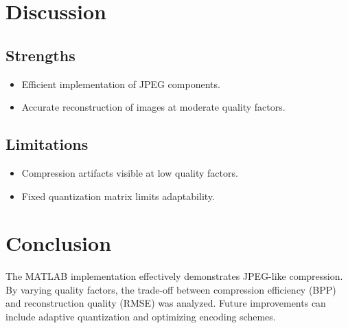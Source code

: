 \documentclass{article}
\begin{document}
\section{Discussion}
\subsection{Strengths}
\begin{itemize}
    \item Efficient implementation of JPEG components.
    \item Accurate reconstruction of images at moderate quality factors.
\end{itemize}

\subsection{Limitations}
\begin{itemize}
    \item Compression artifacts visible at low quality factors.
    \item Fixed quantization matrix limits adaptability.
\end{itemize}


\section{Conclusion}
The MATLAB implementation effectively demonstrates JPEG-like compression. By varying quality factors, the trade-off between compression efficiency (BPP) and reconstruction quality (RMSE) was analyzed. Future improvements can include adaptive quantization and optimizing encoding schemes.
\end{document}
